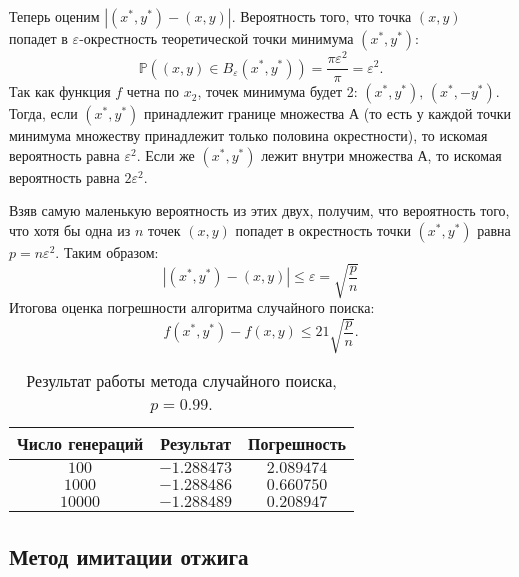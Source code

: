 \documentclass[a4paper, 11pt]{article}
\theoremstyle{def}
\theoremstyle{th}
\theoremstyle{rem}
\newcommand{\p}{\mathbb{P}}
\begin{document}
Теперь оценим $|(x^*, y^*) - (x, y)|$. Вероятность того, что точка $(x, y)$ попадет в $\varepsilon$-окрестность теоретической точки минимума $(x^*, y^*)$:
$$
\p((x, y) \in B_\varepsilon(x^*, y^*)) = \frac{\pi \varepsilon^2}{\pi} = \varepsilon^2.
$$
Так как функция $f$ четна по $x_2$, точек минимума будет 2: $(x^*, y^*), \, (x^*, -y^*)$. Тогда, если $(x^*, y^*)$ принадлежит границе множества А (то есть у каждой точки минимума множеству принадлежит только половина окрестности), то искомая вероятность равна $\varepsilon^2$. Если же $(x^*, y^*)$ лежит внутри множества А, то искомая вероятность равна $2\varepsilon^2$.

Взяв самую маленькую вероятность из этих двух, получим, что вероятность того, что хотя бы одна из $n$ точек $(x, y)$ попадет в окрестность точки $(x^*, y^*)$ равна $p = n\varepsilon^2.$ Таким образом:
$$|(x^*, y^*) - (x, y)| \leqslant \varepsilon = \sqrt{\frac{p}{n}}$$
Итогова оценка погрешности алгоритма случайного поиска:
$$
f(x^*, y^*) - f(x, y) \leqslant 21\sqrt{\frac{p}{n}}.
$$


\begin{table}[h]
\begin{center}
\begin{tabular}{|c|c|c|}
\hline
Число генераций &
Результат  &
Погрешность
\\
\hline
$100$
&
$-1.288473$
&
$2.089474$
\\
\hline
$1000$
&
$-1.288486$
&
$0.660750$
\\
\hline
$10000$
&
$-1.288489$
&
$0.208947$

\\
\hline
\end{tabular}
\end{center}
\caption{Результат работы метода случайного поиска, $p = 0.99$.}
\end{table}

\subsection{Метод имитации отжига}
\end{document}
